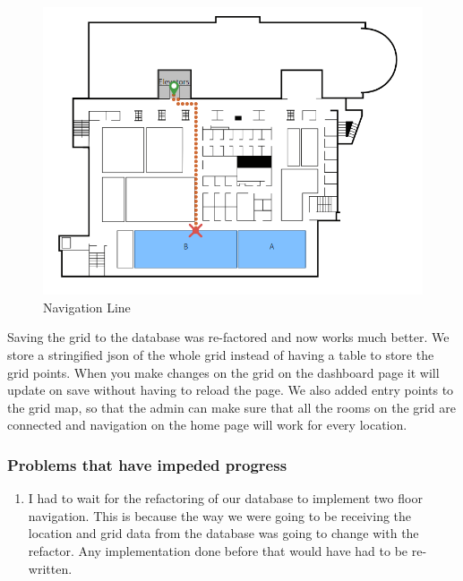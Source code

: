 \documentclass[letterpaper,10pt,serif,titlepage, onecolumn, compsoc]{IEEEtran}
\begin{document}
\begin{figure}[h!]
\centering
\captionsetup{justification=centering,margin=2cm}
\includegraphics[width=1\textwidth,natwidth=771,natheight=584]{images/line.png}
\caption{Navigation Line}
\label{fig:method}
\end{figure}

Saving the grid to the database was re-factored and now works much better. We store a stringified json of the whole grid instead of having a table to store the grid points. When you make changes on the grid on the dashboard page it will update on save without having to reload the page. We also added entry points to the grid map, so that the admin can make sure that all the rooms on the grid are connected and navigation on the home page will work for every location. 

\subsubsection{Problems that have impeded progress}
\begin{enumerate}
\item I had to wait for the refactoring of our database to implement two floor navigation. This is because the way we were going to be receiving the location and grid data from the database was going to change with the refactor. Any implementation done before that would have had to be re-written. 
\end{enumerate} 
\end{document}
